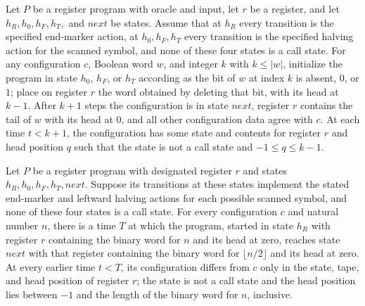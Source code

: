 \begin{lemma}
\label{Complexity.LogProg.halfL_run}
\leanok
{}
Let $P$ be a register program with oracle and input, let $r$ be a register, and let
$h_R,h_0,h_F,h_T,$ and $next$ be states. Assume that at $h_R$ every transition is the
specified end-marker action, at $h_0,h_F,h_T$ every transition is the specified halving
action for the scanned symbol, and none of these four states is a call state. For any
configuration $c$, Boolean word $w$, and integer $k$ with $k\le |w|$, initialize the
program in state $h_0$, $h_F$, or $h_T$ according as the bit of $w$ at index $k$ is
absent, $0$, or $1$; place on register $r$ the word obtained by deleting that bit, with
its head at $k-1$. After $k+1$ steps the configuration is in state $next$, register $r$
contains the tail of $w$ with its head at $0$, and all other configuration data agree
with $c$. At each time $t<k+1$, the configuration has some state and contents for
register $r$ and head position $q$ such that the state is not a call state and $-1\le
q\le k-1$.
\end{lemma}

\begin{lemma}
\label{Complexity.LogProg.half_run}
\leanok
{}
Let $P$ be a register program with designated register $r$ and states
$h_R,h_0,h_F,h_T,next$. Suppose its transitions at these states implement the stated
end-marker and leftward halving actions for each possible scanned symbol, and none of
these four states is a call state. For every configuration $c$ and natural number $n$,
there is a time $T$ at which the program, started in state $h_R$ with register $r$
containing the binary word for $n$ and its head at zero, reaches state $next$ with that
register containing the binary word for $\lfloor n/2\rfloor$ and its head at zero. At
every earlier time $t<T$, its configuration differs from $c$ only in the state, tape,
and head position of register $r$; the state is not a call state and the head position
lies between $-1$ and the length of the binary word for $n$, inclusive.
\end{lemma}

